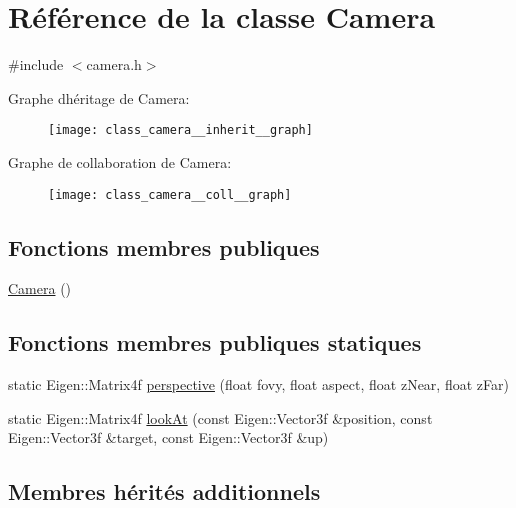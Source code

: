 \hypertarget{class_camera}{}\section{Référence de la classe Camera}
\label{class_camera}


{\ttfamily \#include $<$camera.\+h$>$}



Graphe d\textquotesingle{}héritage de Camera\+:\nopagebreak
\begin{figure}[H]
\begin{center}
\leavevmode
\texttt{[image: class\_camera\_\_inherit\_\_graph]}
\end{center}
\end{figure}


Graphe de collaboration de Camera\+:\nopagebreak
\begin{figure}[H]
\begin{center}
\leavevmode
\texttt{[image: class\_camera\_\_coll\_\_graph]}
\end{center}
\end{figure}
\subsection*{Fonctions membres publiques}
\begin{DoxyCompactItemize}
\item 
\hyperlink{class_camera_a01f94c3543f56ede7af49dc778f19331}{Camera} ()
\end{DoxyCompactItemize}
\subsection*{Fonctions membres publiques statiques}
\begin{DoxyCompactItemize}
\item 
static Eigen\+::\+Matrix4f \hyperlink{class_camera_aa63f48a3280871eba3a6f74a3c0f2e2e}{perspective} (float fovy, float aspect, float z\+Near, float z\+Far)
\item 
static Eigen\+::\+Matrix4f \hyperlink{class_camera_a683a2e432969a485412c28e18567c174}{look\+At} (const Eigen\+::\+Vector3f \&position, const Eigen\+::\+Vector3f \&target, const Eigen\+::\+Vector3f \&up)
\end{DoxyCompactItemize}
\subsection*{Membres hérités additionnels}



